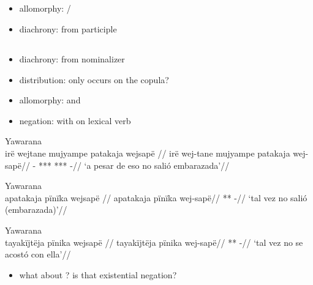 \documentclass{memoir}
\begin{document}
\subsection{\texorpdfstring{}{}}

\begin{itemize}
\tightlist
\item
  allomorphy: /
\item
  diachrony: from participle 
\end{itemize}

\subsection{\texorpdfstring{}{}}

\begin{itemize}
\tightlist
\item
  diachrony: from nominalizer 
\item
  distribution: only occurs on the copula?
\item
  allomorphy:  and 
\item
  negation: with  on lexical verb
\end{itemize}

\ex Yawarana \\
\label{ctoaragrme-38}    \begingl
    \glpreamble  irë wejtane mujyampe patakaja wejsapë //
    \gla irë wej-tane mujyampe patakaja wej-sapë//
    \glb {} - *** *** -//
        \glft ‘a pesar de eso no salió embarazada’//  
    \endgl 
\xe

\ex Yawarana \\
\label{ctoaragrme-39}    \begingl
    \glpreamble  apatakaja pïnïka wejsapë //
    \gla apatakaja pïnïka wej-sapë//
    \glb ***  -//
        \glft ‘tal vez no salió (embarazada)’//  
    \endgl 
\xe

\ex Yawarana \\
\label{ctoaragrme-40}    \begingl
    \glpreamble  tayakïjtëja pïnika wejsapë //
    \gla tayakïjtëja pïnika wej-sapë//
    \glb ***  -//
        \glft ‘tal vez no se acostó con ella’//  
    \endgl 
\xe

\begin{itemize}
\tightlist
\item
  what about ? is that existential negation?
\end{itemize}
\end{document}
